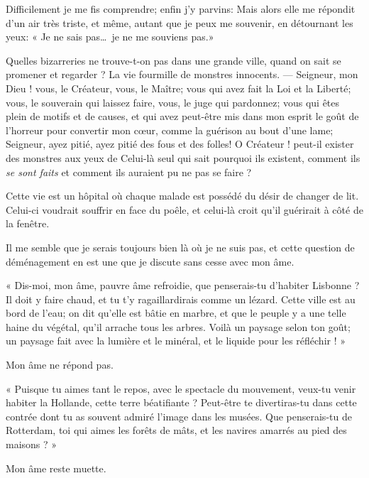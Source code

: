 Difficilement je me fis comprendre; enfin j’y parvins:
Mais alors elle me répondit d’un air très triste, et
même, autant que je peux me souvenir, en détournant les yeux: « Je ne
sais pas\ldots\ je ne me souviens pas.»

Quelles bizarreries ne trouve{}-t{}-on pas dans une grande ville, quand
on sait se promener et regarder ? La vie fourmille de monstres
innocents. --- Seigneur, mon Dieu ! vous, le Créateur, vous, le Maître;
vous qui avez fait la Loi et la Liberté; vous, le souverain qui laissez
faire, vous, le juge qui pardonnez; vous qui êtes plein de motifs et de
causes, et qui avez peut{}-être mis dans mon esprit le goût de
l’horreur pour convertir mon c\oe ur, comme la guérison
au bout d’une lame; Seigneur, ayez pitié, ayez pitié
des fous et des folles! O Créateur ! peut{}-il exister des monstres aux
yeux de Celui{}-là seul qui sait pourquoi ils existent, comment ils \textit{se
sont faits} et comment ils auraient pu ne pas se faire ?


Cette vie est un hôpital où chaque malade est possédé du désir de
changer de lit. Celui{}-ci voudrait souffrir en face du poêle, et
celui{}-là croit qu’il guérirait à côté de la fenêtre.

Il me semble que je serais toujours bien là où je ne suis pas, et cette
question de déménagement en est une que je discute sans cesse avec mon
âme.

« Dis{}-moi, mon âme, pauvre âme refroidie, que penserais{}-tu
d’habiter Lisbonne ? Il doit y faire chaud, et tu
t’y ragaillardirais comme un lézard. Cette ville est
au bord de l’eau; on dit qu’elle est
bâtie en marbre, et que le peuple y a une telle haine du végétal,
qu’il arrache tous les arbres. Voilà un paysage selon
ton goût; un paysage fait avec la lumière et le minéral, et le liquide
pour les réfléchir ! »

Mon âme ne répond pas.

« Puisque tu aimes tant le repos, avec le spectacle du mouvement,
veux{}-tu venir habiter la Hollande, cette terre béatifiante ?
Peut{}-être te divertiras{}-tu dans cette contrée dont tu as souvent
admiré l’image dans les musées. Que penserais{}-tu de
Rotterdam, toi qui aimes les forêts de mâts, et les navires amarrés au
pied des maisons ? »

Mon âme reste muette.

